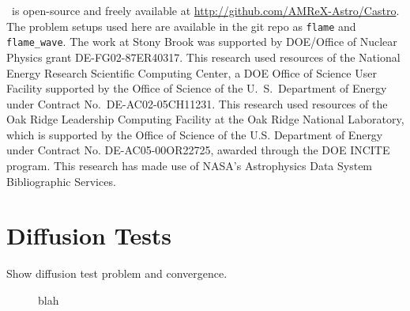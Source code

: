 \documentclass[preprint,times,tighten]{aastex63}
\newcommand{\castro}{{\sf Castro}}
\begin{document}
\acknowledgements \castro\ is open-source and freely available at
\url{http://github.com/AMReX-Astro/Castro}.  The problem setups used
here are available in the git repo as {\tt flame} and {\tt
  flame\_wave}.  The work at Stony Brook was supported by DOE/Office
of Nuclear Physics grant DE-FG02-87ER40317.  This research used
resources of the National Energy Research Scientific Computing Center,
a DOE Office of Science User Facility supported by the Office of
Science of the U.~S.\ Department of Energy under Contract
No.\ DE-AC02-05CH11231.  This research used resources of the Oak Ridge
Leadership Computing Facility at the Oak Ridge National Laboratory,
which is supported by the Office of Science of the U.S. Department of
Energy under Contract No. DE-AC05-00OR22725, awarded through the DOE
INCITE program.  This research has made use of NASA's Astrophysics
Data System Bibliographic Services.






\appendix

\section{Diffusion Tests}
\label{app:diffusion}

Show diffusion test problem and convergence.

\begin{figure}[t]
\centering
{}
\caption{\label{fig:diffusion} blah}
\end{figure}





\end{document}
